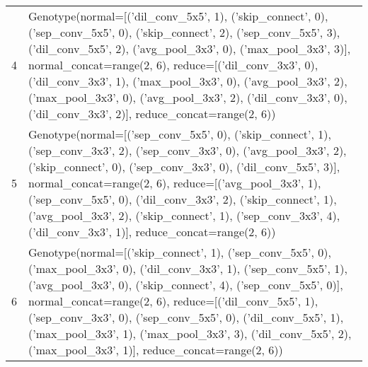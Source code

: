 \documentclass[runningheads]{llncs}
\begin{document}
\begin{table*}
\begin{center}
\begin{footnotesize}
\begin{tabular}{cp{11cm}}
				\\
				4 & Genotype(normal=[('dil\_conv\_5x5', 1), ('skip\_connect', 0), ('sep\_conv\_5x5', 0), ('skip\_connect', 2), ('sep\_conv\_5x5', 3), ('dil\_conv\_5x5', 2), ('avg\_pool\_3x3', 0), ('max\_pool\_3x3', 3)], normal\_concat=range(2, 6),
				reduce=[('dil\_conv\_3x3', 0), ('dil\_conv\_3x3', 1), ('max\_pool\_3x3', 0), ('avg\_pool\_3x3', 2), ('max\_pool\_3x3', 0), ('avg\_pool\_3x3', 2), ('dil\_conv\_3x3', 0), ('dil\_conv\_3x3', 2)], reduce\_concat=range(2, 6))
				
				\\
				5 & Genotype(normal=[('sep\_conv\_5x5', 0), ('skip\_connect', 1), ('sep\_conv\_3x3', 2), ('sep\_conv\_3x3', 0), ('avg\_pool\_3x3', 2), ('skip\_connect', 0), ('sep\_conv\_3x3', 0), ('dil\_conv\_5x5', 3)], normal\_concat=range(2, 6),
				reduce=[('avg\_pool\_3x3', 1), ('sep\_conv\_5x5', 0), ('dil\_conv\_3x3', 2), ('skip\_connect', 1), ('avg\_pool\_3x3', 2), ('skip\_connect', 1), ('sep\_conv\_3x3', 4), ('dil\_conv\_3x3', 1)], reduce\_concat=range(2, 6))
				
				\\
				6 &  Genotype(normal=[('skip\_connect', 1), ('sep\_conv\_5x5', 0), ('max\_pool\_3x3', 0), ('dil\_conv\_3x3', 1), ('sep\_conv\_5x5', 1), ('avg\_pool\_3x3', 0), ('skip\_connect', 4), ('sep\_conv\_5x5', 0)], normal\_concat=range(2, 6),
				reduce=[('dil\_conv\_5x5', 1), ('sep\_conv\_3x3', 0), ('sep\_conv\_5x5', 0), ('dil\_conv\_5x5', 1), ('max\_pool\_3x3', 1), ('max\_pool\_3x3', 3), ('dil\_conv\_5x5', 2), ('max\_pool\_3x3', 1)], reduce\_concat=range(2, 6))
				\\
				\hline
			\end{tabular}
		\end{footnotesize}
	\end{center}
\end{table*}
\end{document}
